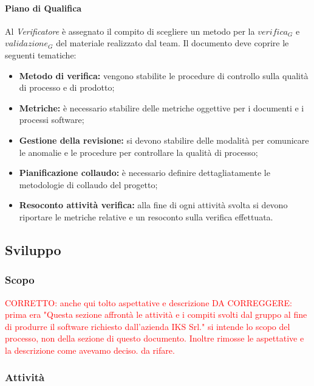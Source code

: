 		\paragraph{Piano di Qualifica} \Spazio
		Al \emph{Verificatore} è assegnato il compito di scegliere un metodo per la $verifica_G$ e $validazione_G$ del materiale realizzato dal team.
		Il documento deve coprire le seguenti tematiche:
		\begin{itemize}
		\item \textbf{Metodo di verifica:} vengono stabilite le procedure di controllo sulla qualità di processo e di prodotto;
		\item \textbf{Metriche:} è necessario stabilire delle metriche oggettive per i documenti e i processi software;
		\item \textbf{Gestione della revisione:} si devono stabilire delle modalità per comunicare le anomalie e le procedure per controllare la qualità di processo;
		\item \textbf{Pianificazione collaudo:} è necessario definire dettagliatamente le metodologie di collaudo del progetto;
		\item \textbf{Resoconto attività verifica:} alla fine di ogni attività svolta si devono riportare le metriche relative e un resoconto sulla verifica effettuata.
		\end{itemize}
	
\subsection{Sviluppo}
	\subsubsection{Scopo}
		\textcolor{red}{CORRETTO: anche qui tolto aspettative e descrizione}
	\textcolor{red}{DA CORREGGERE: prima era "Questa sezione affrontà le attività e i compiti svolti dal gruppo al fine di produrre il software richiesto dall'azienda IKS Srl." si intende lo scopo del processo, non della sezione di questo documento. Inoltre rimosse le aspettative e la descrizione come avevamo deciso. da rifare.}

	\subsubsection{Attività}
